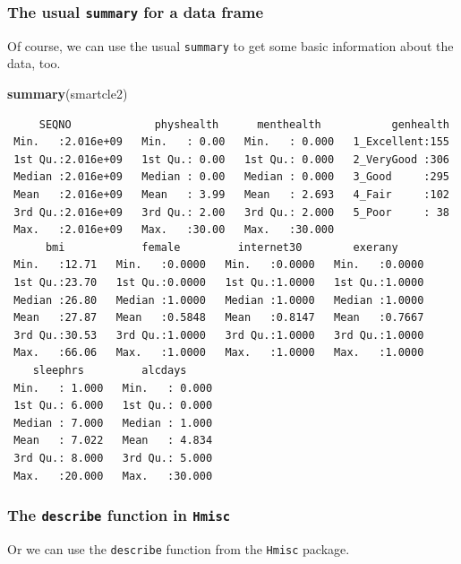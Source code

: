 \documentclass[]{book}
\newenvironment{Shaded}{\begin{snugshade}}{\end{snugshade}}
\newcommand{\KeywordTok}[1]{\textcolor[rgb]{0.13,0.29,0.53}{\textbf{#1}}}
\newcommand{\NormalTok}[1]{#1}
\theoremstyle{definition}
\theoremstyle{definition}
\theoremstyle{definition}
\theoremstyle{remark}
\begin{document}
\subsubsection{\texorpdfstring{The usual \texttt{summary} for a data
frame}{The usual summary for a data frame}}\label{the-usual-summary-for-a-data-frame}

Of course, we can use the usual \texttt{summary} to get some basic
information about the data, too.

\begin{Shaded}
\begin{Highlighting}[]
\KeywordTok{summary}\NormalTok{(smartcle2)}
\end{Highlighting}
\end{Shaded}

\begin{verbatim}
     SEQNO             physhealth      menthealth           genhealth  
 Min.   :2.016e+09   Min.   : 0.00   Min.   : 0.000   1_Excellent:155  
 1st Qu.:2.016e+09   1st Qu.: 0.00   1st Qu.: 0.000   2_VeryGood :306  
 Median :2.016e+09   Median : 0.00   Median : 0.000   3_Good     :295  
 Mean   :2.016e+09   Mean   : 3.99   Mean   : 2.693   4_Fair     :102  
 3rd Qu.:2.016e+09   3rd Qu.: 2.00   3rd Qu.: 2.000   5_Poor     : 38  
 Max.   :2.016e+09   Max.   :30.00   Max.   :30.000                    
      bmi            female         internet30        exerany      
 Min.   :12.71   Min.   :0.0000   Min.   :0.0000   Min.   :0.0000  
 1st Qu.:23.70   1st Qu.:0.0000   1st Qu.:1.0000   1st Qu.:1.0000  
 Median :26.80   Median :1.0000   Median :1.0000   Median :1.0000  
 Mean   :27.87   Mean   :0.5848   Mean   :0.8147   Mean   :0.7667  
 3rd Qu.:30.53   3rd Qu.:1.0000   3rd Qu.:1.0000   3rd Qu.:1.0000  
 Max.   :66.06   Max.   :1.0000   Max.   :1.0000   Max.   :1.0000  
    sleephrs         alcdays      
 Min.   : 1.000   Min.   : 0.000  
 1st Qu.: 6.000   1st Qu.: 0.000  
 Median : 7.000   Median : 1.000  
 Mean   : 7.022   Mean   : 4.834  
 3rd Qu.: 8.000   3rd Qu.: 5.000  
 Max.   :20.000   Max.   :30.000  
\end{verbatim}

\subsubsection{\texorpdfstring{The \texttt{describe} function in
\texttt{Hmisc}}{The describe function in Hmisc}}\label{the-describe-function-in-hmisc}

Or we can use the \texttt{describe} function from the \texttt{Hmisc}
package.
\end{document}
